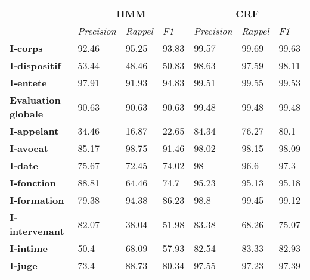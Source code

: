 \begin{table}[!h]
	\centering
	\scriptsize
	\begin{tabular}{|l|l|l|l|l|l|l|}
		\hline
	\multirow{2}{*}{}	& \multicolumn{3}{c}{\textbf{HMM}}  &      \multicolumn{3}{|c|}{\textbf{CRF}}          \\ \cline{2-7}
		& \textit{Precision} & \textit{Rappel} & \textit{F1} & \textit{Precision} & \textit{Rappel} & \textit{F1} \\ \hline
		\textbf{I-corps}       & 92.46              & 95.25           & 93.83       & 99.57              & 99.69           & 99.63       \\ 
		\textbf{I-dispositif}  & 53.44              & 48.46           & 50.83       & 98.63              & 97.59           & 98.11       \\ 
		\textbf{I-entete}      & 97.91              & 91.93           & 94.83       & 99.51              & 99.55           & 99.53       \\ \hline
		\textbf{Evaluation globale}       & 90.63              & 90.63           & 90.63       & 99.48              & 99.48           & 99.48       \\ \hline
		\noalign{\smallskip}\hline\noalign{\smallskip}
		\textbf{I-appelant}    & 34.46              & 16.87           & 22.65       & 84.34              & 76.27           & 80.1        \\ 
		\textbf{I-avocat}      & 85.17              & 98.75           & 91.46       & 98.02              & 98.15           & 98.09       \\ 
		\textbf{I-date}        & 75.67              & 72.45           & 74.02       & 98                 & 96.6            & 97.3        \\ 
		\textbf{I-fonction}    & 88.81              & 64.46           & 74.7        & 95.23              & 95.13           & 95.18       \\ 
		\textbf{I-formation}   & 79.38              & 94.38           & 86.23       & 98.8               & 99.45           & 99.12       \\ 
		\textbf{I-intervenant} & 82.07              & 38.04           & 51.98       & 83.38              & 68.26           & 75.07       \\ 
		\textbf{I-intime}      & 50.4               & 68.09           & 57.93       & 82.54              & 83.33           & 82.93       \\ 
		\textbf{I-juge}        & 73.4               & 88.73           & 80.34       & 97.55              & 97.23           & 97.39       \\ 

\end{tabular}
\end{table}
